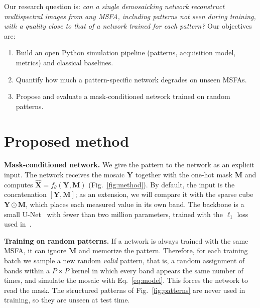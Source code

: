 \documentclass{article}
\def\X{{\mathbf X}}
\def\Y{{\mathbf Y}}
\def\M{{\mathbf M}}
\begin{document}
Our research question is: \emph{can a single demosaicking network reconstruct
multispectral images from any MSFA, including patterns not seen during
training, with a quality close to that of a network trained for each
pattern?} Our objectives are:
\begin{enumerate}
  \item Build an open Python simulation pipeline (patterns, acquisition model,
        metrics) and classical baselines.
  \item Quantify how much a pattern-specific network degrades on unseen MSFAs.
  \item Propose and evaluate a mask-conditioned network trained on random
        patterns.
\end{enumerate}

\section{Proposed method}
\label{sec:method}

\textbf{Mask-conditioned network.} We give the pattern to the network as an
explicit input. The network receives the mosaic $\Y$ together with the
one-hot mask $\M$ and computes $\hat\X=f_\theta(\Y,\M)$
(Fig.~\ref{fig:method}). By default, the input is the concatenation
$[\Y,\M]$; as an extension, we will compare it with the sparse cube
$\Y\odot\M$, which places each measured value in its own band. The backbone is
a small
U-Net~\cite{ronneberger2015} with fewer than two million parameters, trained
with the $\ell_1$ loss used in~\cite{diaz2023}.

\textbf{Training on random patterns.} If a network is always trained with the
same MSFA, it can ignore $\M$ and memorize the pattern. Therefore, for each
training batch we sample a new random \emph{valid} pattern, that is, a random
assignment of bands within a $P\times P$ kernel in which every band appears the
same number of times, and simulate the mosaic with Eq.~\eqref{eq:model}. This
forces the network to read the mask. The structured patterns of
Fig.~\ref{fig:patterns} are never used in training, so they are unseen at test
time.
\end{document}
